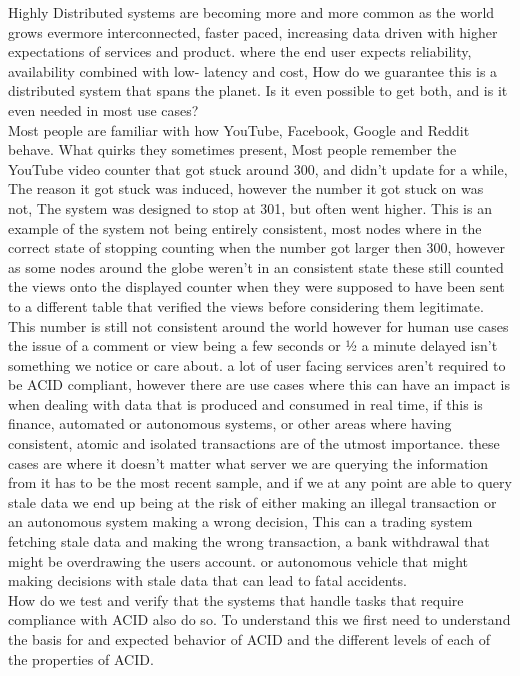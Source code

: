 \documentclass[a4paper,10pt,titlepage]{report}
\begin{document}
Highly Distributed systems are becoming more and more common as the world grows evermore interconnected, faster paced, increasing data driven with higher expectations of services and product. where the end user expects reliability, availability combined with low- latency and cost, How do we guarantee this is a distributed system that spans the planet. Is it even possible to get both, and is it even needed in most use cases?\\

Most people are familiar with how YouTube, Facebook, Google and Reddit behave. What quirks they sometimes present, Most people remember the YouTube video counter that got stuck around 300, and didn't update for a while, The reason it got stuck was induced, however the number it got stuck on was not, The system was designed to stop at 301, but often went higher. This is an example of the system not being entirely consistent, most nodes where in the correct state of stopping counting when the number got larger then 300, however as some nodes around the globe weren't in an consistent state these still counted the views onto the displayed counter when they were supposed to have been sent to a different table that verified the views before considering them legitimate. This number is still not consistent around the world however for human use cases the issue of a comment or view being a few seconds or ½ a minute delayed isn't something we notice or care about. a lot of user facing services aren't required to be ACID compliant, however there are use cases where this can have an impact is when dealing with data that is produced and consumed in real time, if this is finance, automated or autonomous systems, or other areas where having consistent, atomic and isolated transactions are of the utmost importance. these cases are where it doesn't matter what server we are querying the information from it has to be the most recent sample, and if we at any point are able to query stale data we end up being at the risk of either making an illegal transaction or an autonomous system making a wrong decision, This can a trading system fetching stale data and making the wrong transaction, a bank withdrawal that might be overdrawing the users account. or autonomous vehicle that might making decisions with stale data that can lead to fatal accidents. \\

How do we test and verify that the systems that handle tasks that require compliance with ACID also do so. To understand this we first need to understand the basis for and expected behavior of ACID and the different levels of each of the properties of ACID.
\end{document}
